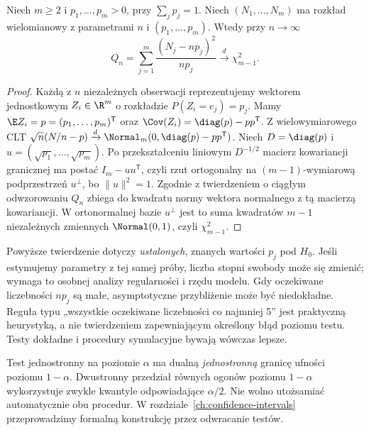\begin{twierdzenie}
\label{thm:pearson-chi-square}
Niech $m\ge2$ i $p_1,\ldots,p_m>0$, przy
$\sum_jp_j=1$. Niech $(N_1,\ldots,N_m)$ ma rozkład
wielomianowy z parametrami $n$ i
$(p_1,\ldots,p_m)$. Wtedy przy $n\to\infty$
\[
 Q_n=\sum_{j=1}^m\frac{(N_j-np_j)^2}{np_j}
 \xrightarrow{d}\chi^2_{m-1}.
\]
\end{twierdzenie}
\begin{proof}
Każdą z $n$ niezależnych obserwacji reprezentujemy wektorem
jednostkowym $Z_i\in\R^m$ o rozkładzie
$P(Z_i=e_j)=p_j$. Mamy
$\E Z_i=p=(p_1,\ldots,p_m)^{\mathsf T}$ oraz
$\Cov(Z_i)=\diag(p)-pp^{\mathsf T}$.
Z wielowymiarowego CLT
$\sqrt n(N/n-p)\xrightarrow{d}\Normal_m(0,
\diag(p)-pp^{\mathsf T})$.
Niech $D=\diag(p)$ i $u=(\sqrt{p_1},\ldots,\sqrt{p_m})$.
Po przekształceniu liniowym $D^{-1/2}$ macierz
kowariancji granicznej ma postać
$I_m-uu^{\mathsf T}$, czyli rzut ortogonalny na
$(m-1)$-wymiarową podprzestrzeń $u^\perp$, bo
$\|u\|^2=1$. Zgodnie z twierdzeniem o ciągłym
odwzorowaniu $Q_n$ zbiega do kwadratu normy wektora
normalnego z tą macierzą kowariancji. W ortonormalnej
bazie $u^\perp$ jest to suma kwadratów $m-1$
niezależnych zmiennych $\Normal(0,1)$, czyli
$\chi^2_{m-1}$.
\end{proof}

\begin{uwaga}
Powyższe twierdzenie dotyczy \emph{ustalonych}, znanych
wartości $p_j$ pod $H_0$. Jeśli estymujemy parametry z tej
samej próby, liczba stopni swobody może się zmienić; wymaga
to osobnej analizy regularności i rzędu modelu.
Gdy oczekiwane liczebności $np_j$ są małe, asymptotyczne
przybliżenie może być niedokładne. Reguła typu
„wszystkie oczekiwane liczebności co najmniej 5” jest
praktyczną heurystyką, a nie twierdzeniem zapewniającym
określony błąd poziomu testu. Testy dokładne i procedury
symulacyjne bywają wówczas lepsze.
\end{uwaga}

\begin{uwaga}
Test jednostronny na poziomie $\alpha$ ma dualną
\emph{jednostronną} granicę ufności poziomu $1-\alpha$.
Dwustronny przedział równych ogonów poziomu $1-\alpha$
wykorzystuje zwykle kwantyle odpowiadające $\alpha/2$.
Nie wolno utożsamiać automatycznie obu procedur. W
rozdziale~\ref{ch:confidence-intervals} przeprowadzimy
formalną konstrukcję przez odwracanie testów.
\end{uwaga}

